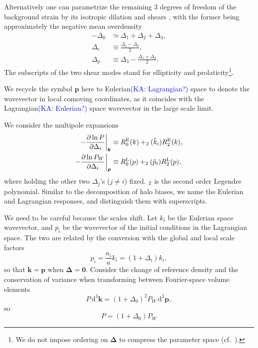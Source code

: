 \documentclass[a4paper,11pt]{article}
\let\L\relax
\DeclareMathOperator{\L}{\mathcal{L}}
\renewcommand{\d}{\mathrm{d}}
\newcommand{\vk}{{\bm k}}
\newcommand{\vp}{{\bm p}}
\newcommand{\vDelta}{{\bm\Delta}}
\newcommand{\Euler}{\mathrm{E}}
\newcommand{\Lagrange}{\mathrm{L}}
\newcommand{\KA}[1]{\textcolor{Blue}{(KA: #1)}}
\begin{document}
Alternatively one can parametrize the remaining 3 degrees of freedom of the
background strain by its isotropic dilation and shears \cite{BondMyers96I},
with the former being approximately the negative mean overdensity
\begin{align}
    -\Delta_0 &\simeq \Delta_1 + \Delta_2 + \Delta_3, \nonumber\\
    \Delta_\mathrm{e} &\equiv \frac{\Delta_1 - \Delta_2}2, \nonumber\\
    \Delta_\mathrm{p} &\equiv \Delta_3 - \frac{\Delta_1 + \Delta_2}2.
\end{align}
The subscripts of the two shear modes stand for ellipticity and
prolaticity\footnote{We do not impose ordering on $\vDelta$ to compress the
parameter space (cf.\ \cite{BondMyers96I}).}.


We recycle the symbol $\vp$ here to Eulerian\KA{Lagrangian?} space to denote the wavevector in
local comoving coordinates, as it coincides with the Lagrangian\KA{Eulerian?}  space
wavevector in the large scale limit.

We consider the multipole expansions
\begin{align}
    - \frac{\partial\ln P}{\partial\Delta_i} \bigg|_\vk
    &\equiv R^\Euler_0(k) + \L_2(\hat k_i) R^\Euler_2(k), \nonumber\\
    - \frac{\partial\ln P_W}{\partial\Delta_i} \bigg|_\vp
    &\equiv R^\Lagrange_0(p) + \L_2(\hat p_i) R^\Lagrange_2(p),
\end{align}
where holding the other two $\Delta_j$'s ($j \neq i$) fixed.
$\L_2$ is the second order Legendre polynomial.
Similar to the decomposition of halo biases, we name the Eulerian and
Lagrangian responses, and distinguish them with superscripts.

We need to be careful because the scales shift.
Let $k_i$ be the Eulerian space wavevector, and $p_i$ be the wavevector of the
initial conditions in the Lagrangian space.
The two are related by the conversion with the global and local scale factors
\begin{equation}
    p_i = \frac{a_i}a k_i = (1 + \Delta_i) k_i,
\end{equation}
so that $\vk = \vp$ when $\vDelta = \bm0$.
Consider the change of reference density and the conservation of variance when
transforming between Fourier-space volume elements
\begin{equation}
    P \,\d^3\vk = (1 + \Delta_0)^2 P_W \,\d^3\vp,
\end{equation}
so
\begin{equation}
    P = (1 + \Delta_0) P_W
\end{equation}
\end{document}
